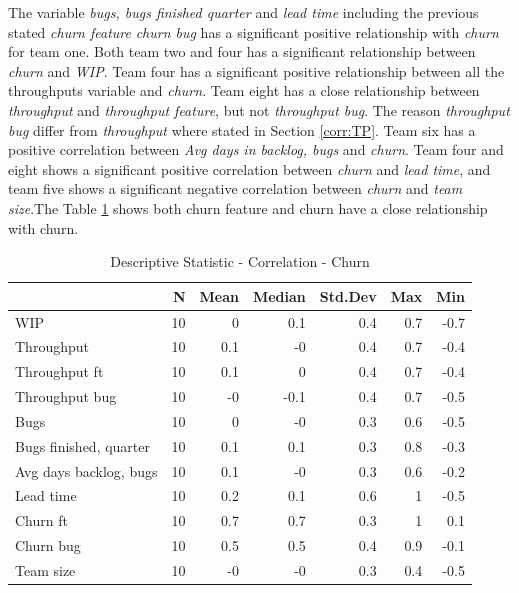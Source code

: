 \documentclass[UKenglish]{ifimaster}  %
\begin{document}
The variable \textit{bugs, bugs finished quarter} and \textit{lead time} including the previous stated \textit{churn feature} \textit{churn bug} has a significant positive relationship with \textit{churn} for team one. Both team two and four has a significant relationship between \textit{churn} and \textit{WIP}. Team four has a significant positive relationship between all the throughputs variable and \textit{churn}. Team eight has a close relationship between \textit{throughput} and \textit{throughput feature}, but not \textit{throughput bug}. The reason \textit{throughput bug} differ from \textit{throughput} where stated in Section \ref{corr:TP}. Team six has a positive correlation between \textit{Avg days in backlog, bugs} and \textit{churn}. Team four and eight shows a significant positive correlation between \textit{churn} and \textit{lead time}, and team five shows a significant negative correlation between \textit{churn} and \textit{team size}.The Table \ref{DS:corr:Churn} shows both churn feature and churn have a close relationship with churn.
 
\begin{table}[!htbp]
 \centering
 \begin{tabular}{ | l | r | r | r | r | r | r | }
 \hline
& \bf{N} & \bf{Mean} & \bf{Median} & \bf{Std.Dev} & \bf{Max} & \bf{Min} \\ \hline
WIP  & 10 & 0 & 0.1 & 0.4 & 0.7 & -0.7\\ \hline
Throughput  & 10 & 0.1 & -0 & 0.4 & 0.7 & -0.4\\ \hline
Throughput ft  & 10 & 0.1 & 0 & 0.4 & 0.7 & -0.4\\ \hline
Throughput bug  & 10 & -0 & -0.1 & 0.4 & 0.7 & -0.5\\ \hline
Bugs  & 10 & 0 & -0 & 0.3 & 0.6 & -0.5\\ \hline
Bugs finished, quarter  & 10 & 0.1 & 0.1 & 0.3 & 0.8 & -0.3\\ \hline
Avg days backlog, bugs  & 10 & 0.1 & -0 & 0.3 & 0.6 & -0.2\\ \hline
Lead time & 10 & 0.2 & 0.1 & 0.6 & 1 & -0.5\\ \hline
Churn ft  & 10 & 0.7 & 0.7 & 0.3 & 1 & 0.1\\ \hline
Churn bug  & 10 & 0.5 & 0.5 & 0.4 & 0.9 & -0.1\\ \hline
Team size  & 10 & -0 & -0 & 0.3 & 0.4 & -0.5\\ \hline
\end{tabular}
 \caption{Descriptive Statistic - Correlation - Churn}
 \label{DS:corr:Churn}
 \end{table}
 
\end{document}
